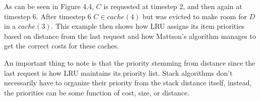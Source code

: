 As can be seen in Figure 4.4, $C$ is requested at timestep 2, and then again at timestep 6. After timestep 6 $C \in cache(4)$ but was evicted to make room for $D$ in a $cache(3)$. This example then shows how LRU assigns its item priorities based on distance from the last request and how Mattson's algorithm manages to get the correct costs for these caches.

An important thing to note is that the priority stemming from distance since the 
last request is how LRU maintains its priority list. Stack algorithms don't necessarily have to organize their priority from the stack distance itself, instead, the priorities can be some function of cost, size, or distance.